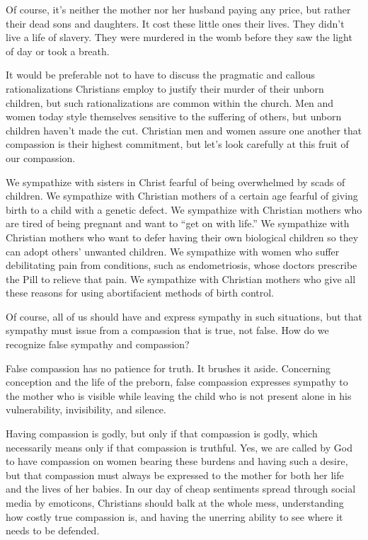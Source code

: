 \documentclass[
]{book}
\begin{document}
Of course, it's neither the mother nor her husband paying any price, but rather their dead sons and daughters. It cost these little ones their lives. They didn't live a life of slavery. They were murdered in the womb before they saw the light of day or took a breath.

It would be preferable not to have to discuss the pragmatic and callous rationalizations Christians employ to justify their murder of their unborn children, but such rationalizations are common within the church. Men and women today style themselves sensitive to the suffering of others, but unborn children haven't made the cut. Christian men and women assure one another that compassion is their highest commitment, but let's look carefully at this fruit of our compassion.

We sympathize with sisters in Christ fearful of being overwhelmed by scads of children. We sympathize with Christian mothers of a certain age fearful of giving birth to a child with a genetic defect. We sympathize with Christian mothers who are tired of being pregnant and want to ``get on with life.'' We sympathize with Christian mothers who want to defer having their own biological children so they can adopt others' unwanted children. We sympathize with women who suffer debilitating pain from conditions, such as endometriosis, whose doctors prescribe the Pill to relieve that pain. We sympathize with Christian mothers who give all these reasons for using abortifacient methods of birth control.

Of course, all of us should have and express sympathy in such situations, but that sympathy must issue from a compassion that is true, not false. How do we recognize false sympathy and compassion?

False compassion has no patience for truth. It brushes it aside. Concerning conception and the life of the preborn, false compassion expresses sympathy to the mother who is visible while leaving the child who is not present alone in his vulnerability, invisibility, and silence.

Having compassion is godly, but only if that compassion is godly, which necessarily means only if that compassion is truthful. Yes, we are called by God to have compassion on women bearing these burdens and having such a desire, but that compassion must always be expressed to the mother for both her life and the lives of her babies. In our day of cheap sentiments spread through social media by emoticons, Christians should balk at the whole mess, understanding how costly true compassion is, and having the unerring ability to see where it needs to be defended.
\end{document}
